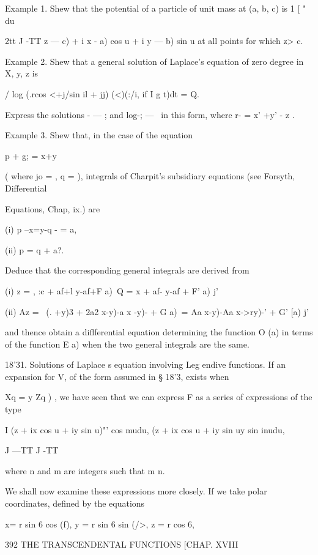 Example 1. Shew that the potential of a particle of unit mass at (a, b, c) is 
1 [ " du 



2tt J -TT  z — c) + i  x - a) cos u + i y — b) sin u 
at all points for which z> c. 

Example 2. Shew that a general solution of Laplace's equation of zero degree in 
X, y, z is 

/ log (.rcos <+j/sin il + jj)  (<)(:/i, if I g t)dt = Q. 

Express the solutions -  — ; and log-; — \   in this form, where r- = x' +y' - z . 

Example 3. Shew that, in the case of the equation 

p  + g;  = x+y 

( where jo =  , q =  ), integrals of Charpit's subsidiary equations (see Forsyth, Differential 

Equations, Chap, ix.) are 

(i) p --x=y-q - = a, 

(ii) p = q + a?. 

Deduce that the corresponding general integrals are derived from 

(i) z =  , :c + af+l y-af+F a)\ 
Q =  x + af- y-af + F'  a) j' 

(ii) Az = \ (. +y)3 + 2a2  x-y)-a   x -y)-  + G a)\ 
= Aa x-y)-Aa  x->ry)-'  + G' [a) j' 

and thence obtain a diflferential equation determining the function O (a) in terms of the 
function E a) when the two general integrals are the same. 

18'31. Solutions of Laplace s equation involving Leg endive functions. 
If an expansion for V, of the form assumed in § 18'3, exists when 

Xq = y  Zq    ) , 
we have seen that we can express F as a series of expressions of the type 

I (z + ix cos u + iy sin u)"' cos mudu, (z + ix cos u + iy sin uy  sin inudu, 

J —TT J -TT 

where n and m are integers such that  m n. 

We shall now examine these expressions more closely. 
If we take polar coordinates, defined by the equations 

x= r sin 6 cos (f), y = r sin 6 sin (/>, z = r cos 6, 



392 THE TRANSCENDENTAL FUNCTIONS [CHAP. XVIII 


